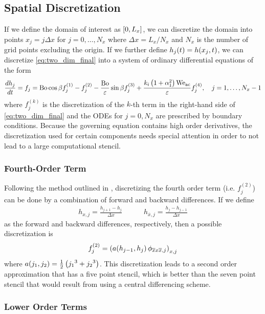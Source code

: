 \subsection{Spatial Discretization}
If we define the domain of interest as $\left[ 0, L_x \right]$, we can discretize the 
domain into points $x_j = j\Delta x$ for $j = 0, \ldots, N_x$ where 
$\Delta x = L_x / N_x$ and $N_x$ is the number of grid points excluding the origin. 
If we further define $h_j\!\left( t \right) = h\!\left( x_j, t \right)$, we can discretize 
\cref{eq:two_dim_final} into a system of ordinary differential equations of the form 
\begin{equation}
    \frac{d h_j}{d t} = f_j = \mathrm{Bo}\cos \beta f_j^{(1)} - f_j^{(2)} -  \frac{\mathrm{Bo}}{\varepsilon} \sin \beta f_j^{(3)} +  
    \frac{k_i \left( 1 + \alpha_1^2 \right) \mathrm{We_{ac}}}{\varepsilon} f_j^{(4)}, \quad j = 1, \ldots, N_x-1
    \label{eq:ode_sys}
\end{equation}
where $f_j^{(k)}$ is the discretization of the $k$-th term in
the right-hand side of \cref{eq:two_dim_final} and the ODEs for $j = 0, N_x$ are prescribed by boundary conditions. 
Because the governing equation 
contains high order derivatives, the discretization used for certain components 
needs special attention in order to not lead to a large computational stencil.

\subsubsection{Fourth-Order Term}
Following the method outlined in \cite{kondic2003instabilities}, discretizing the fourth order term (i.e.\! $f_j^{(2)}$) can be done by a combination
of forward and backward differences. If we define 
\begin{align*}
    h_{x, j} = \frac{h_{j+1} - h_j}{\Delta x} \quad \quad \quad h_{\overline{x}, j} = \frac{h_{j} - h_{j-1}}{\Delta x}
\end{align*}
as the forward and backward differences, respectively, then a possible discretization is 
\begin{equation}
    f_j^{\left( 2 \right)} = \left( a\!\left( h_{j-1}, h_j \right) \phi_{\overline{x}x\overline{x}, j} \right)_{x, j}
    \label{eq:f2_disc}
\end{equation}
where $a\!\left( j_1, j_2 \right) = \frac{1}{2} \left( {j_1}^3 + {j_2}^3 \right)$. This discretization leads to a 
second order approximation that has a five point stencil, which is better than the seven point stencil
that would result from using a central differencing scheme. 

\subsubsection{Lower Order Terms}
